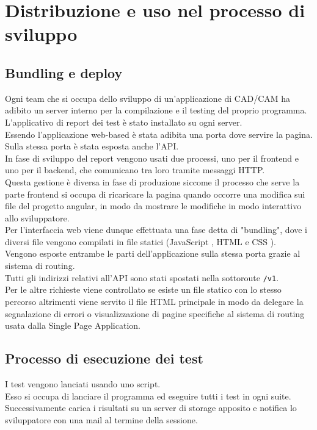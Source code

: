 \chapter{Distribuzione e uso nel processo di sviluppo}

    \section{Bundling e deploy}
        Ogni team che si occupa dello sviluppo di un'applicazione di CAD/CAM ha adibito un server interno per la compilazione e il testing del proprio programma.\\
        L'applicativo di report dei test è stato installato su ogni server.\\

        Essendo l'applicazione web-based è stata adibita una porta dove servire la pagina.\\
        Sulla stessa porta è stata esposta anche l'API.\\

        In fase di sviluppo del report vengono usati due processi, uno per il frontend e uno per il backend, che comunicano tra loro tramite messaggi HTTP.\\
        Questa gestione è diversa in fase di produzione siccome il processo che serve la parte frontend si occupa di ricaricare la pagina quando occorre una modifica sui file del progetto angular, in modo da mostrare le modifiche in modo interattivo allo sviluppatore.\\
        Per l'interfaccia web viene dunque effettuata una fase detta di "bundling", dove i diversi file  vengono compilati in file statici (JavaScript \cite{JS}, HTML \cite{HTML} e CSS \cite{CSS}).\\
        Vengono esposte entrambe le parti dell'applicazione sulla stessa porta grazie al sistema di routing.\\
        Tutti gli indirizzi relativi all'API sono stati spostati nella sottoroute \verb|/v1|.\\
        Per le altre richieste viene controllato se esiste un file statico con lo stesso percorso altrimenti viene servito il file HTML principale in modo da delegare la segnalazione di errori o visualizzazione di pagine specifiche al sistema di routing usata dalla Single Page Application.\\

    \section{Processo di esecuzione dei test\label{testexecution}}
        I test vengono lanciati usando uno script.\\
        Esso si occupa di lanciare il programma ed eseguire tutti i test in ogni suite.\\
        Successivamente carica i risultati su un server di storage apposito e notifica lo sviluppatore con una mail al termine della sessione.\\

